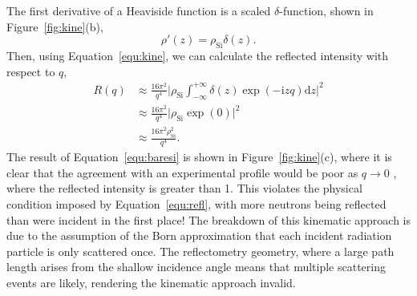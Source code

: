 \documentclass[
 reprint,
 superscriptaddress,
 amsmath,amssymb,
 aps,
]{revtex4-2}
\begin{document}
The first derivative of a Heaviside function is a scaled $\delta$-function, shown in Figure~\ref{fig:kine}(b), 
%
\begin{equation}
    \rho'(z) = \rho_{\text{Si}}\delta(z).
\end{equation}
%
Then, using Equation~\ref{equ:kine}, we can calculate the reflected intensity with respect to $q$, 
%
\begin{equation}
    \begin{aligned}
    R(q) & \approx \frac{16\pi^2}{q^4} \bigg| \rho_{\text{Si}}\int^{+\infty}_{-\infty}{\delta(z)\exp{(-\mathrm{i} zq) \text{d}z}} \bigg|^2 \\ 
     & \approx \frac{16\pi^2}{q^4} \bigg| \rho_{\text{Si}} \exp{(0)} \bigg| ^2 \\
     & \approx \frac{16\pi^2\rho_{\text{Si}}^2}{q^4}.
    \end{aligned}
    \label{equ:baresi}
\end{equation}
%
The result of Equation~\ref{equ:baresi} is shown in Figure~\ref{fig:kine}(c), where it is clear that the agreement with an experimental profile would be poor as $q \to 0$ \cite{majkrzak_exact_1998}, where the reflected intensity is greater than \num{1}. 
This violates the physical condition imposed by Equation~\ref{equ:refl}, with more neutrons being reflected than were incident in the first place!
The breakdown of this kinematic approach is due to the assumption of the Born approximation that each incident radiation particle is only scattered once. 
The reflectometry geometry, where a large path length arises from the shallow incidence angle means that multiple scattering events are likely, rendering the kinematic approach invalid. 
\end{document}
